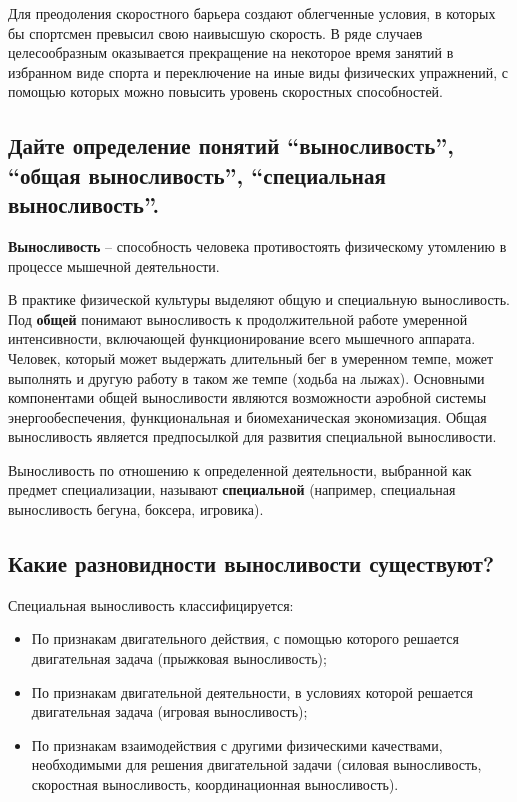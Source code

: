 Для преодоления скоростного барьера создают облегченные условия, в которых бы спортсмен превысил свою наивысшую скорость.
В ряде случаев целесообразным оказывается прекращение на некоторое время занятий в избранном виде спорта и переключение на иные
виды физических упражнений, с помощью которых можно повысить уровень скоростных способностей.


\subsection{Дайте определение понятий ``выносливость'', ``общая выносливость'', ``специальная выносливость''.}

\textbf{Выносливость} – способность человека противостоять физическому утомлению в процессе мышечной деятельности.

В практике физической культуры выделяют общую и специальную выносливость. Под \textbf{общей} понимают выносливость к
продолжительной работе умеренной интенсивности, включающей функционирование всего мышечного аппарата.
Человек, который может выдержать длительный бег в умеренном темпе, может выполнять и другую работу в таком же темпе
(ходьба на лыжах). Основными компонентами общей выносливости являются возможности аэробной системы энергообеспечения,
функциональная и биомеханическая экономизация. Общая выносливость является предпосылкой для развития специальной выносливости.

Выносливость по отношению к определенной деятельности, выбранной как предмет специализации, называют
\textbf{специальной} (например, специальная выносливость бегуна, боксера, игровика).


\subsection{Какие разновидности выносливости существуют?}

Специальная выносливость классифицируется:
\begin{itemize}
    \item По признакам двигательного действия, с помощью которого решается двигательная задача (прыжковая выносливость);
    \item По признакам двигательной деятельности, в условиях которой решается двигательная задача (игровая выносливость);
    \item По признакам взаимодействия с другими физическими качествами, необходимыми для решения двигательной задачи
          (силовая выносливость, скоростная выносливость, координационная выносливость).
\end{itemize}

